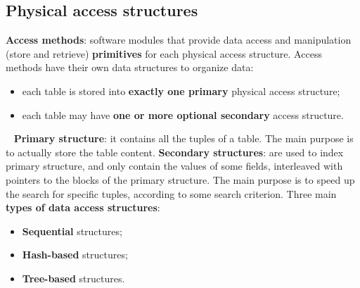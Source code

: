 \subsection{Physical access structures}
\textbf{Access methods}: software modules that provide data access and manipulation (store and retrieve) \textbf{primitives} for each physical access structure.\newline
\newline
Access methods have their own data structures to organize data:
\begin{itemize}
    \item each table is stored into \textbf{exactly one primary} physical access structure;
    \item each table may have \textbf{one or more optional secondary} access structure.
\end{itemize}
\ \newline
\textbf{Primary structure}: it contains all the tuples of a table. The main purpose is to actually store the table content.\newline
\newline
\textbf{Secondary structures}: are used to index primary structure, and only contain the values of some fields, interleaved with pointers to the blocks of the primary structure. The main purpose is to speed up the search for specific tuples, according to some search criterion.\newline
{}\newline
\newline
Three main \textbf{types of data access structures}:
\begin{itemize}
    \item \textbf{Sequential} structures;
    \item \textbf{Hash-based} structures;
    \item \textbf{Tree-based} structures.
\end{itemize}
